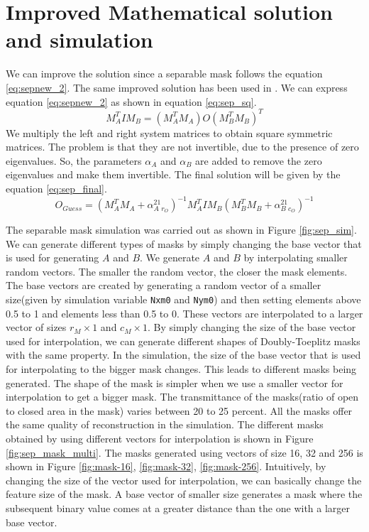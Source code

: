 \section{Improved Mathematical solution and simulation}
We can improve the solution since a separable mask follows the equation \ref{eq:sepnew_2}. The same improved solution has been used in \cite{Toeplitz}. We can express equation \ref{eq:sepnew_2} as shown in equation \ref{eq:sep_sq}.
\begin{equation}
M_{A}^TIM_{B} = (M_{A}^TM_{A})O(M_{B}^TM_B)^T 
\label{eq:sep_sq}
\end{equation} 
We multiply the left and right system matrices to obtain square symmetric matrices. The problem is that they are not invertible, due to the presence of zero eigenvalues. So, the parameters $\alpha_A$ and $\alpha_B$ are added to remove the zero eigenvalues and make them invertible. The final solution will be given by the equation \ref{eq:sep_final}.
\begin{equation}
O_{Guess} = (M_{A}^TM_A + \alpha_{A}^21_{r_{O}})^{-1}M_{A}^TIM_{B}(M_{B}^TM_B + \alpha_{B}^21_{c_{O}})^{-1}
\label{eq:sep_final}
\end{equation}

The separable mask simulation was carried out as shown in Figure \ref{fig:sep_sim}. We can generate different types of masks by simply changing the base vector that is used for generating $A$ and $B$. We generate $A$ and $B$ by interpolating smaller random vectors. The smaller the random vector, the closer the mask elements. The base vectors are created by generating a random vector of a smaller size(given by simulation variable \texttt{Nxm0} and \texttt{Nym0}) and then setting elements above 0.5 to 1 and elements less than 0.5 to 0. These vectors are interpolated to a larger vector of sizes $r_M \times 1$ and $c_M \times 1$. By simply changing the size of the base vector used for interpolation, we can generate different shapes of Doubly-Toeplitz masks with the same property. In the simulation, the size of the base vector that is used for interpolating to the bigger mask changes. This leads to different masks being generated. The shape of the mask is simpler when we use a smaller vector for interpolation to get a bigger mask. The transmittance of the masks(ratio of open to closed area in the mask) varies between 20 to 25 percent. All the masks offer the same quality of reconstruction in the simulation. The different masks obtained by using different vectors for interpolation is shown in Figure \ref{fig:sep_mask_multi}. The masks generated using vectors of size 16, 32 and 256 is shown in Figure \ref{fig:mask-16}, \ref{fig:mask-32}, \ref{fig:mask-256}. Intuitively, by changing the size of the vector used for interpolation, we can basically change the feature size of the mask. A base vector of smaller size generates a mask where the subsequent binary value comes at a greater distance than the one with a larger base vector.


